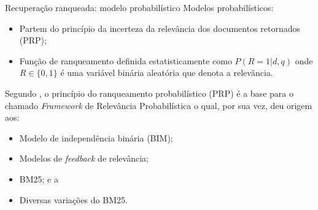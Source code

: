 \documentclass[%
  10pt,%
  aspectratio = 169,%
  compress,%
  t,%
]{beamer}%
\begin{document}
    \begin{frame}[fragile = singleslide]{}{Recuperação ranqueada: modelo probabilístico}
        Modelos probabilísticos:
        \begin{itemize}
            \item Partem do princípio da incerteza da relevância dos documentos retornados (PRP);
            \item Função de ranqueamento definida estatisticamente como $P(R = 1| d,q)$ onde $R \in \{0, 1\}$ é uma variável binária aleatória que denota a relevância.
        \end{itemize}

        Segundo \cite[p.~333]{robertson_probabilistic_2010}, o
        princípio do ranqueamento probabilístico (PRP) é a base para o chamado \textit{Framework} de Relevância Probabilística o qual, por sua vez, deu origem aos:
        \begin{itemize}
            \item Modelo de independência binária (BIM);
            \item Modelos de \textit{feedback} de relevância;
            \item BM25; e a
            \item Diversas variações do BM25.
        \end{itemize}
    \end{frame}
\end{document}
